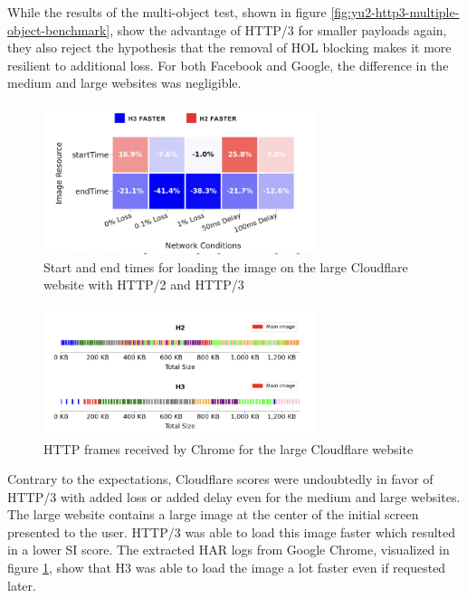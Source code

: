 \documentclass[conference]{IEEEtran}
\begin{document}
While the results of the multi-object test, shown in figure \ref{fig:yu2-http3-multiple-object-benchmark}, show the advantage of HTTP/3 for smaller payloads again, they also reject the hypothesis that the removal of HOL blocking makes it more resilient to additional loss. For both Facebook and Google, the difference in the medium and large websites was negligible. 

\begin{figure}[htbp]
  \begin{center}
  \includegraphics[width=8cm,keepaspectratio]{images/Yu2/Image load comparison.png}
  \caption{Start and end times for loading the image on the large Cloudflare website with HTTP/2 and HTTP/3}
  \label{fig:yu2-image-load-comparison}
  \end{center}
\end{figure}

\begin{figure}[htbp]
  \begin{center}
  \includegraphics[width=8cm,keepaspectratio]{images/Yu2/Chrome HTTP frames.png}
  \caption{HTTP frames received by Chrome for the large Cloudflare website}
  \label{fig:yu2-chrome-http-frames}
  \end{center}
\end{figure}

Contrary to the expectations, Cloudflare scores were undoubtedly in favor of HTTP/3 with added loss or added delay even for the medium and large websites. The large website contains a large image at the center of the initial screen presented to the user. HTTP/3 was able to load this image faster which resulted in a lower SI score. The extracted HAR logs from Google Chrome, visualized in figure \ref{fig:yu2-image-load-comparison}, show that H3 was able to load the image a lot faster even if requested later. 
\end{document}
